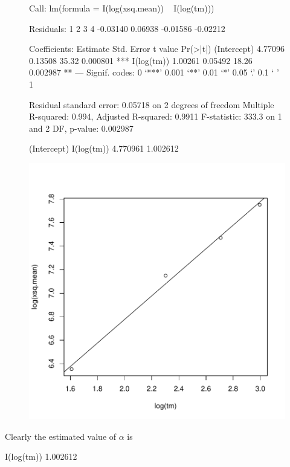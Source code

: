 \documentclass[12pt]{article}
\begin{document}
\begin{figure}[H]
\begin{Schunk}
\begin{Soutput}
Call:
lm(formula = I(log(xsq.mean)) ~ I(log(tm)))

Residuals:
       1        2        3        4 
-0.03140  0.06938 -0.01586 -0.02212 

Coefficients:
            Estimate Std. Error t value Pr(>|t|)    
(Intercept)  4.77096    0.13508   35.32 0.000801 ***
I(log(tm))   1.00261    0.05492   18.26 0.002987 ** 
---
Signif. codes:  0 ‘***’ 0.001 ‘**’ 0.01 ‘*’ 0.05 ‘.’ 0.1 ‘ ’ 1 

Residual standard error: 0.05718 on 2 degrees of freedom
Multiple R-squared: 0.994,	Adjusted R-squared: 0.9911 
F-statistic: 333.3 on 1 and 2 DF,  p-value: 0.002987 
\end{Soutput}
\begin{Soutput}
(Intercept)  I(log(tm)) 
   4.770961    1.002612 
\end{Soutput}
\end{Schunk}
\includegraphics{HW4-002}
\end{figure}
\item Clearly the estimated value of $\alpha$ is 
\begin{Schunk}
\begin{Soutput}
I(log(tm)) 
  1.002612 
\end{Soutput}
\end{Schunk}
\end{document}
